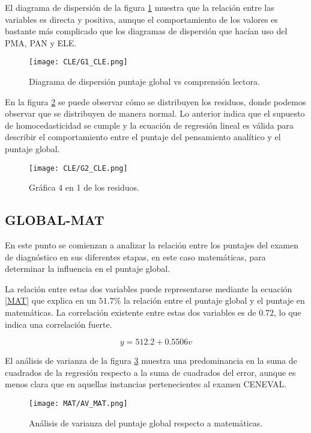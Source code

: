 \documentclass{article}
\begin{document}
El diagrama de dispersión de la figura \ref{fig:G1_CLE} muestra que la relación entre las variables es directa y positiva, aunque el comportamiento de los valores es bastante más complicado que los diagramas de dispersión que hacían uso del PMA, PAN y ELE.

\begin{figure}[H]
    \centering
    \texttt{[image: CLE/G1\_CLE.png]}
    \caption{Diagrama de dispersión puntaje global vs comprensión lectora.}
    \label{fig:G1_CLE}
\end{figure}

En la figura \ref{fig:G2_CLE} se puede observar cómo se distribuyen los residuos, donde podemos observar que se distribuyen de manera normal. Lo anterior indica que el supuesto de homocedasticidad se cumple y la ecuación de regresión lineal es válida para describir el comportamiento entre el puntaje del pensamiento analítico y el puntaje global.

\begin{figure}[H]
    \centering
    \texttt{[image: CLE/G2\_CLE.png]}
    \caption{Gráfica 4 en 1 de los residuos.}
    \label{fig:G2_CLE}
\end{figure}

\subsection{GLOBAL-MAT}

En este punto se comienzan a analizar la relación entre los puntajes del examen de diagnóstico en sus diferentes etapas, en este caso matemáticas, para determinar la influencia en el puntaje global.

La relación entre estas dos variables puede representarse mediante la ecuación \ref{MAT} que explica en un $51.7\%$ la relación entre el puntaje global y el puntaje en matemáticas. La correlación existente entre estas dos variables es de $0.72$, lo que indica una correlación fuerte.

\begin{equation}
    y = 512.2 + 0.5506v
    \label{MAT}
\end{equation}

El análisis de varianza de la figura \ref{fig:AV_MAT} muestra una predominancia en la suma de cuadrados de la regresión respecto a la suma de cuadrados del error, aunque es menos clara que en aquellas instancias pertenecientes al examen CENEVAL.

\begin{figure}[H]
    \centering
    \texttt{[image: MAT/AV\_MAT.png]}
    \caption{Análisis de varianza del puntaje global respecto a matemáticas.}
    \label{fig:AV_MAT}
\end{figure}
\end{document}
